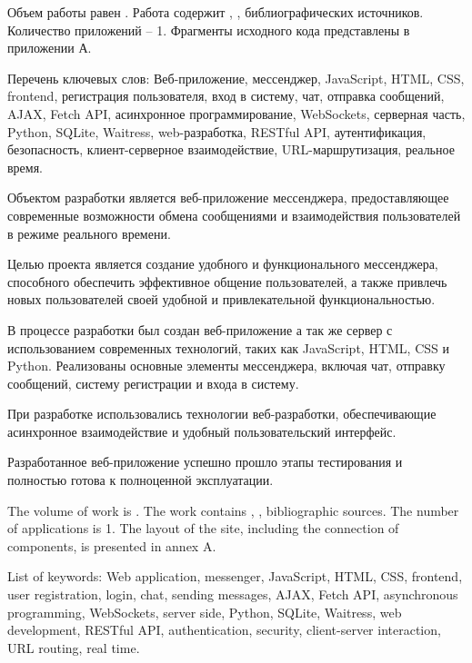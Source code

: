 
Объем работы равен . Работа содержит , ,  библиографических источников. Количество приложений – 1. Фрагменты исходного кода представлены в приложении А. 

Перечень ключевых слов: Веб-приложение, мессенджер, JavaScript, HTML, CSS, frontend, регистрация пользователя, вход в систему, чат, отправка сообщений, AJAX, Fetch API, асинхронное программирование, WebSockets, серверная часть, Python, SQLite, Waitress, web-разработка, RESTful API, аутентификация, безопасность, клиент-серверное взаимодействие, URL-маршрутизация, реальное время.

Объектом разработки является веб-приложение мессенджера, предоставляющее современные возможности обмена сообщениями и взаимодействия пользователей в режиме реального времени.

Целью проекта является создание удобного и функционального мессенджера, способного обеспечить эффективное общение пользователей, а также привлечь новых пользователей своей удобной и привлекательной функциональностью.

В процессе разработки был создан веб-приложение а так же сервер с использованием современных технологий, таких как JavaScript, HTML, CSS и Python. Реализованы основные элементы мессенджера, включая чат, отправку сообщений, систему регистрации и входа в систему.

При разработке использовались технологии веб-разработки, обеспечивающие асинхронное взаимодействие и удобный пользовательский интерфейс.

Разработанное веб-приложение успешно прошло этапы тестирования и полностью готова к полноценной эксплуатации.


The volume of work is . The work contains , ,  bibliographic sources. The number of applications is 1. The layout of the site, including the connection of components, is presented in annex A.

List of keywords: Web application, messenger, JavaScript, HTML, CSS, frontend, user registration, login, chat, sending messages, AJAX, Fetch API, asynchronous programming, WebSockets, server side, Python, SQLite, Waitress, web development, RESTful API, authentication, security, client-server interaction, URL routing, real time.


